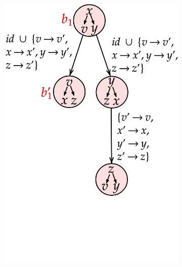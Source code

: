 {\begin{figure}[t]
\begin{center}
\begin{subfigure}[b]{0.32\linewidth}
                \end{subfigure}
		\begin{subfigure}[b]{0.33\linewidth}
		  \includegraphics[scale=0.15]{figs/netys/decomp2.png}
                \end{subfigure}
		\begin{subfigure}[b]{0.33\linewidth}

\end{subfigure}
\end{center}
\end{figure}}
